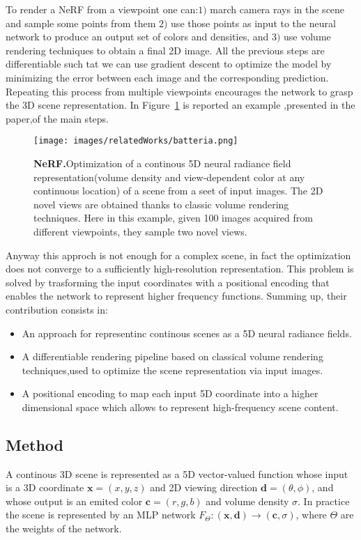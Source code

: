 To render a NeRF from a viewpoint one can:$1)$ march camera rays in the 
scene and sample some points from them $2)$ use those points as input to the neural
network to produce an output set of colors and densities, and $3)$ use volume 
rendering techniques to obtain a final 2D image. All the previous steps
are differentiable such tat we can use gradient descent to optimize the model
by minimizing the error between each image and the corresponding prediction.
Repeating this process from multiple viewpoints encourages the network to 
grasp the 3D scene representation. In Figure~\ref{fig:batteria} is reported an example
,presented in the paper,of the main steps.
\begin{figure}
    \centering
    \texttt{[image: images/relatedWorks/batteria.png]} 
    \caption{\textbf{NeRF.}Optimization of a continous 5D neural radiance field
    representation(volume density and view-dependent color at any continuous location)
    of a scene from a seet of input images. The 2D novel views are obtained thanks
    to classic volume rendering techniques. Here in this example, given 100
    images acquired from different viewpoints, they sample two novel views.}\label{fig:batteria}
\end{figure}

Anyway this approch is not enough for a complex scene, in fact the optimization 
does not converge to a sufficiently high-resolution representation. This problem
is solved by trasforming the input coordinates with a positional encoding
that enables the network to represent higher frequency functions.
Summing up, their contribution consists in:
\begin{itemize}
    \item An approach for representinc continous scenes as a 5D neural radiance fields.
    \item A differentiable rendering pipeline based on classical volume rendering
    techniques,used to optimize the scene representation via input images.
    \item A positional encoding to map each input 5D coordinate into a higher dimensional
    space which allows to represent high-frequency scene content.
\end{itemize}
\subsection{Method}
A continous 3D scene is represented as a 5D vector-valued function whose input is a 3D coordinate 
$\textbf{x}=(x,y,z)$ and 2D viewing direction $\textbf{d}=(\theta,\phi)$, and whose output is an emited color 
$\textbf{c} = (r,g,b)$ and volume density $\sigma$. In practice the scene is represented by an MLP network
$F_{\Theta}:(\textbf{x},\textbf{d}) \rightarrow (\textbf{c},\sigma)$, where $\Theta$ are the weights of the network.


